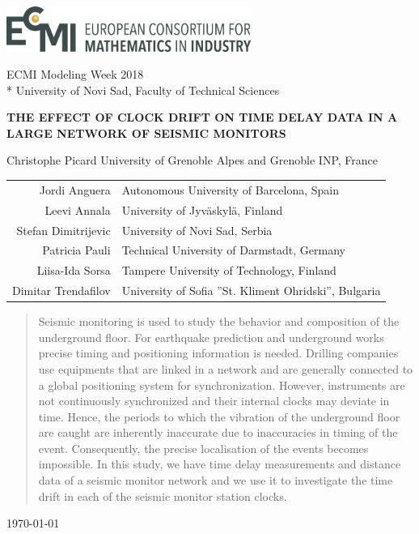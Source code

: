 \documentclass[12pt, sumlimits, intlimits]{article}
\begin{document}
\includegraphics[width=8cm]{../figures/ecmi-logo.png}

ECMI Modeling Week 2018 \\*
University of Novi Sad, Faculty of Technical Sciences

\begin{center}
\vspace{2.0cm}
{\Large{\textbf{\MakeUppercase{The effect of clock drift on time delay data in a large network of seismic monitors}}}}


Christophe Picard University of Grenoble Alpes and Grenoble INP, France

\begin{tabular}{rl}
Jordi Anguera & Autonomous University of Barcelona, Spain \\
Leevi Annala & University of Jyväskylä, Finland \\
Stefan Dimitrijevic & University of Novi Sad, Serbia \\
Patricia Pauli & Technical University of Darmstadt, Germany \\
Liisa-Ida Sorsa & Tampere University of Technology, Finland \\ 
Dimitar Trendafilov & University of Sofia ''St. Kliment Ohridski'', Bulgaria

\end{tabular}

\begin{abstract}
	Seismic monitoring is used to study the behavior and composition of the underground floor. For earthquake prediction and underground works precise timing and positioning information is needed. Drilling companies use equipments that are linked in a network and are generally connected to a global positioning system for synchronization. However, instruments are not continuously  synchronized and their internal clocks may deviate in time. Hence, the periods to which the vibration of the underground floor are caught are inherently inaccurate due to inaccuracies in timing of the event. Consequently, the precise localisation of the events becomes impossible. In this study, we have time delay measurements and distance data of a seismic monitor network and we use it to investigate the time drift in each of the seismic monitor station clocks.
	
\end{abstract}


\today

\end{center}
\end{document}

